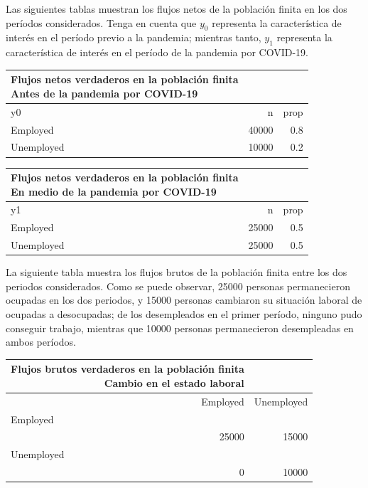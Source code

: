 \documentclass[
  12pt,
  spanish,
]{book}
\begin{document}
Las siguientes tablas muestran los flujos netos de la población finita en los dos períodos considerados. Tenga en cuenta que \(y_0\) representa la característica de interés en el período previo a la pandemia; mientras tanto, \(y_1\) representa la característica de interés en el período de la pandemia por COVID-19.

\captionsetup[table]{labelformat=empty,skip=1pt}
\begin{longtable}{lrr}
\caption*{
{\large Flujos netos verdaderos en la población finita} \\ 
{\small Antes de la pandemia por COVID-19}
} \\ 
\toprule
y0 & n & prop \\ 
\midrule
Employed & 40000 & 0.8 \\ 
Unemployed & 10000 & 0.2 \\ 
 \bottomrule
\end{longtable}
\captionsetup[table]{labelformat=empty,skip=1pt}
\begin{longtable}{lrr}
\caption*{
{\large Flujos netos verdaderos en la población finita} \\ 
{\small En medio de la pandemia por COVID-19}
} \\ 
\toprule
y1 & n & prop \\ 
\midrule
Employed & 25000 & 0.5 \\ 
Unemployed & 25000 & 0.5 \\ 
 \bottomrule
\end{longtable}

La siguiente tabla muestra los flujos brutos de la población finita entre los dos periodos considerados. Como se puede observar, 25000 personas permanecieron ocupadas en los dos periodos, y 15000 personas cambiaron su situación laboral de ocupadas a desocupadas; de los desempleados en el primer período, ninguno pudo conseguir trabajo, mientras que 10000 personas permanecieron desempleadas en ambos períodos.

\captionsetup[table]{labelformat=empty,skip=1pt}
\begin{longtable}{rr}
\caption*{
{\large Flujos brutos verdaderos en la población finita} \\ 
{\small Cambio en el estado laboral}
} \\ 
\toprule
Employed & Unemployed \\ 
\midrule
\multicolumn{1}{l}{Employed} \\ 
\midrule
25000 & 15000 \\ 
\midrule
\multicolumn{1}{l}{Unemployed} \\ 
0 & 10000 \\ 
 \bottomrule
\end{longtable}
\end{document}
